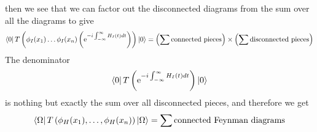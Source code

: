 \documentclass[11pt, notitlepage]{report}
\newcommand{\e}{\mathrm{e}}
\numberwithin{equation}{section}
\begin{document}
then we see that we can factor out the disconnected diagrams from the sum over all the diagrams to give 
\begin{equation*}
    \bra{0}T\left( \phi_I(x_1)\ldots\phi_I(x_n) \left(\e^{-i\int_{-\infty}^{\infty}H_I(t) dt }\right) \right) \ket{0} = \left( \sum \text{connected pieces}  \right) \times \left( \sum \text{disconnected pieces}  \right)
\end{equation*}
The denominator 
\begin{equation*}
    \bra{0}T\left( \e^{-i\int_{-\infty}^{\infty}H_I(t) dt }\right) \ket{0}
\end{equation*}
is nothing but exactly the sum over all disconnected pieces, and therefore we get 
\begin{equation*}
    \bra{\Omega} T\left( \phi_H(x_1),\ldots,\phi_H(x_n)  \right) \ket{\Omega} = \sum \text{connected Feynman diagrams} 
\end{equation*}
\end{document}
